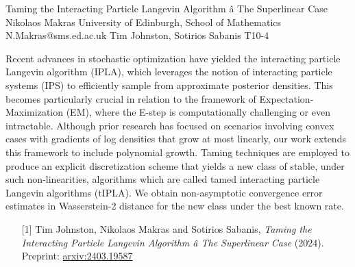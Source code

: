 \begin{talk}
\end{talk}

\begin{talk}
  {Taming the Interacting Particle Langevin Algorithm â The Superlinear Case}%
  {Nikolaos Makras}%
  {University of Edinburgh, School of Mathematics}%
  {N.Makras@sms.ed.ac.uk}%
  {Tim Johnston, Sotirios Sabanis}%
  {T10-4}%
			
Recent advances in stochastic optimization have yielded the interacting particle Langevin algorithm (IPLA), which leverages the notion of interacting particle systems (IPS) to efficiently sample from approximate posterior densities. This becomes particularly crucial in relation to the framework of Expectation-Maximization (EM), where the E-step is computationally challenging or even intractable. Although prior research has focused on scenarios involving convex cases with gradients of log densities that grow at most linearly, our work extends this framework to include polynomial growth. Taming techniques are employed to produce an explicit discretization scheme that yields a new class of stable, under such non-linearities, algorithms which are called tamed interacting particle Langevin algorithms (tIPLA). We obtain non-asymptotic convergence error estimates in Wasserstein-2 distance for the new class under the best known rate. 

\medskip

\begin{enumerate}
	\item[{[1]}] Tim Johnston, Nikolaos Makras and Sotirios Sabanis, {\it Taming the Interacting Particle Langevin Algorithm â The Superlinear Case} (2024). Preprint: \href{https://arxiv.org/abs/2403.19587}{arxiv:2403.19587} 
\end{enumerate}

\end{talk}

